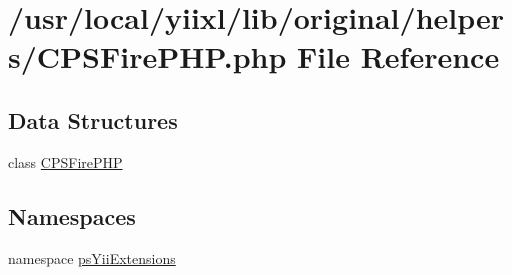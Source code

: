 \hypertarget{CPSFirePHP_8php}{
\section{/usr/local/yiixl/lib/original/helpers/CPSFirePHP.php File Reference}
\label{CPSFirePHP_8php}
}
\subsection*{Data Structures}
\begin{DoxyCompactItemize}
\item 
class \hyperlink{classCPSFirePHP}{CPSFirePHP}
\end{DoxyCompactItemize}
\subsection*{Namespaces}
\begin{DoxyCompactItemize}
\item 
namespace \hyperlink{namespacepsYiiExtensions}{psYiiExtensions}
\end{DoxyCompactItemize}
